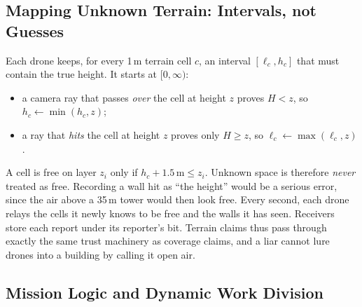 \subsection{Mapping Unknown Terrain: Intervals, not Guesses}

Each drone keeps, for every 1\,m terrain cell $c$, an interval $[\ell_c,h_c]$ that must contain the true height. It
starts at $[0,\infty)$:
\begin{itemize}
    \item a camera ray that passes \emph{over} the cell at height $z$ proves $H<z$, so $h_c\leftarrow\min(h_c,z)$;
    \item a ray that \emph{hits} the cell at height $z$ proves only $H\ge z$, so $\ell_c\leftarrow\max(\ell_c,z)$.
\end{itemize}
A cell is free on layer $z_i$ only if $h_c+1.5\,\mathrm{m}\le z_i$. Unknown space is therefore \emph{never} treated as
free. Recording a wall hit as ``the height'' would be a serious error, since the air above a 35\,m tower would then
look free. Every second, each drone relays the cells it newly knows to be free and the walls it has seen. Receivers
store each report under its reporter's bit. Terrain claims thus pass through exactly the same trust machinery as
coverage claims, and a liar cannot lure drones into a building by calling it open air.

\subsection{Mission Logic and Dynamic Work Division}
\label{sec:mission}


